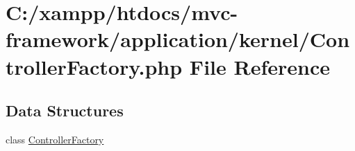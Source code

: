 \hypertarget{_controller_factory_8php}{}\section{C\+:/xampp/htdocs/mvc-\/framework/application/kernel/\+Controller\+Factory.php File Reference}
\label{_controller_factory_8php}
\subsection*{Data Structures}
\begin{DoxyCompactItemize}
\item 
class \hyperlink{class_controller_factory}{Controller\+Factory}
\end{DoxyCompactItemize}
